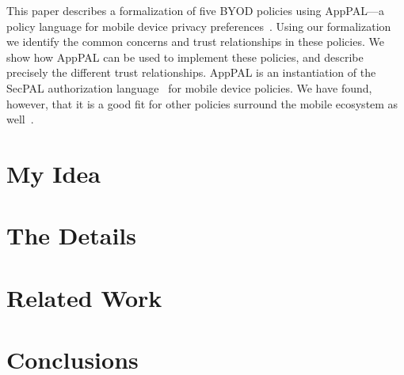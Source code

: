 \documentclass{article}
\begin{document}
This paper describes a formalization of five BYOD policies using AppPAL---a policy language for mobile device privacy preferences~\cite{hallett_apppal_2016}.
Using our formalization we identify the common concerns and trust relationships in these policies.
We show how AppPAL can be used to implement these policies, and describe precisely the different trust relationships.
AppPAL is an instantiation of the SecPAL authorization language~\cite{becker_secpal:_2010} for mobile device policies.
We have found, however, that it is a good fit for other policies surround the mobile ecosystem as well~\cite{hallett_specifying_2016}.

\section{My Idea}
\label{sec:idea}

\section{The Details}
\label{sec:details}

\section{Related Work}
\label{sec:related}

\section{Conclusions}
\label{sec:conclusions}



{}

\end{document}
